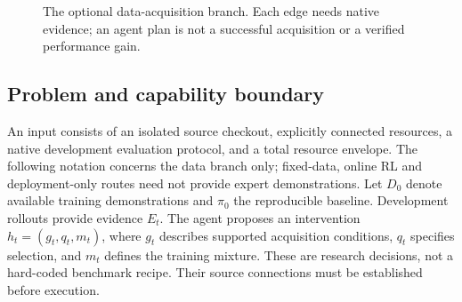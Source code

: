 \documentclass[10pt,twocolumn,letterpaper]{article}
\begin{document}
\begin{figure}[t]
\centering
{}
\caption{The optional data-acquisition branch. Each edge needs native evidence;
an agent plan is not a successful acquisition or a verified performance gain.}
\label{fig:workflow}
\end{figure}
\subsection{Problem and capability boundary}
An input consists of an isolated source checkout, explicitly connected resources,
a native development evaluation protocol, and a total resource envelope. The
following notation concerns the data branch only; fixed-data, online RL and
deployment-only routes need not provide expert demonstrations. Let
$D_0$ denote available training demonstrations and $\pi_0$ the reproducible
baseline. Development rollouts provide evidence $E_t$. The agent proposes an
intervention $h_t=(g_t,q_t,m_t)$, where $g_t$ describes supported acquisition
conditions, $q_t$ specifies selection, and $m_t$ defines the training mixture.
These are research decisions, not a hard-coded benchmark recipe. Their source
connections must be established before execution.
\end{document}
